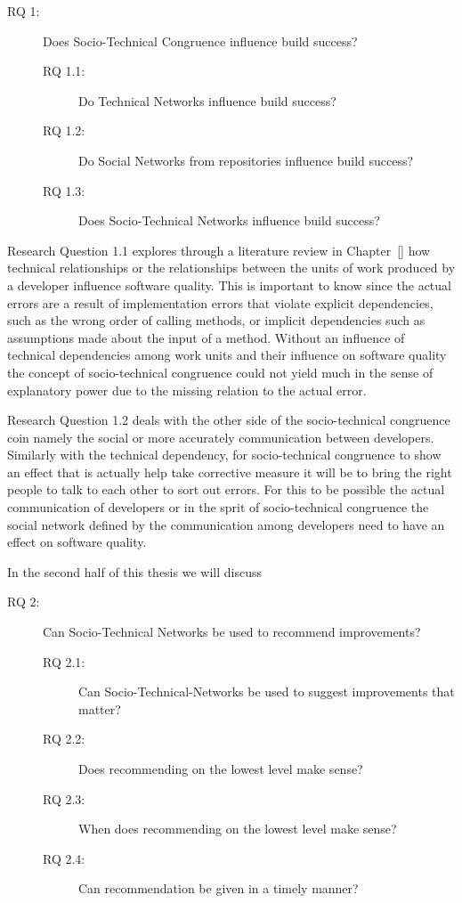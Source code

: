 \begin{description}
% 
\item[RQ 1:] Does Socio-Technical Congruence influence build success?
  \begin{description}
  \item[RQ 1.1:] Do Technical Networks influence build success?
  \item[RQ 1.2:] Do Social Networks from repositories influence build success?
  \item[RQ 1.3:] Does Socio-Technical Networks influence build success?
  \end{description}
%
\end{description}
Research Question 1.1 explores through a literature review in Chapter~\ref{} how technical relationships or the relationships between the units of work produced by a developer influence software quality.
This is important to know since the actual errors are a result of implementation errors that violate explicit dependencies, such as the wrong order of calling methods, or implicit dependencies such as assumptions made about the input of a method. 
Without an influence of technical dependencies among work units and their influence on software quality the concept of socio-technical congruence could not yield much in the sense of explanatory power due to the missing relation to the actual error.

Research Question 1.2 deals with the other side of the socio-technical congruence coin namely the social or more accurately communication between developers.
Similarly with the technical dependency, for socio-technical congruence to show an effect that is actually help take corrective measure it will be to bring the right people to talk to each other to sort out errors. 
For this to be possible the actual communication of developers or in the sprit of socio-technical congruence the social network defined by the communication among developers need to have an effect on software quality.


In the second half of this thesis we will discuss

\begin{description}
%
\item[RQ 2:] Can Socio-Technical Networks be used to recommend improvements? 
  \begin{description}
  \item[RQ 2.1:] Can Socio-Technical-Networks be used to suggest improvements that matter?
  \item[RQ 2.2:] Does recommending on the lowest level make sense?
  \item[RQ 2.3:] When does recommending on the lowest level make sense?
  \item[RQ 2.4:] Can recommendation be given in a timely manner?
  \end{description}
\end{description}



